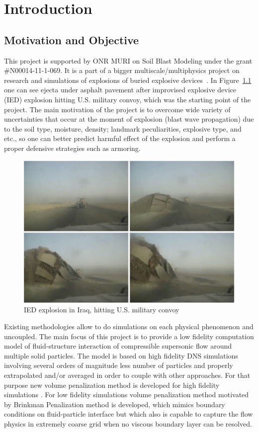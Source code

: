\chapter{Introduction}
\label{chapter:1}

\section{Motivation and Objective}
This project is supported by ONR MURI on Soil Blast Modeling under the grant \#N00014-11-1-069. It is a part of a bigger multiscale/multiphysics project on research and simulations of explosions of buried explosive devices~\cite{proc:muri}. In Figure~\ref{fig:muri_motiv} one can see ejecta under asphalt pavement after improvised explosive device (IED) explosion hitting U.S. military convoy, which was the starting point of the project. The main motivation of the project is to overcome wide variety of uncertainties that occur at the moment of explosion (blast wave propagation) due to the soil type, moisture, density; landmark peculiarities, explosive type, and etc., so one can better predict harmful effect of the explosion and perform a proper defensive strategies such as armoring.
\begin{figure}[h!]
\centering \includegraphics[scale=0.25]{fig/muri_motiv.png}
\caption{IED explosion in Iraq, hitting U.S. military convoy} \label{fig:muri_motiv}
\end{figure}

Existing methodologies allow to do simulations on each physical phenomenon and uncoupled. The main focus of this project is to provide a low fidelity computation model of fluid-structure interaction of compressible supersonic flow around multiple solid particles. The model is based on high fidelity DNS simulations involving several orders of magnitude less number of particles and properly extrapolated and/or averaged in order to couple with other approaches. For that purpose new volume penalization method is developed for high fidelity simulations \cite{ebd_nk_ovv_cbvp_jcp}. For low fidelity simulations volume penalization method motivated by Brinkman Penalization method is developed, which mimics boundary conditions on fluid-particle interface but which also is capable to capture the flow physics in extremely coarse grid when no viscous boundary layer can be resolved.
